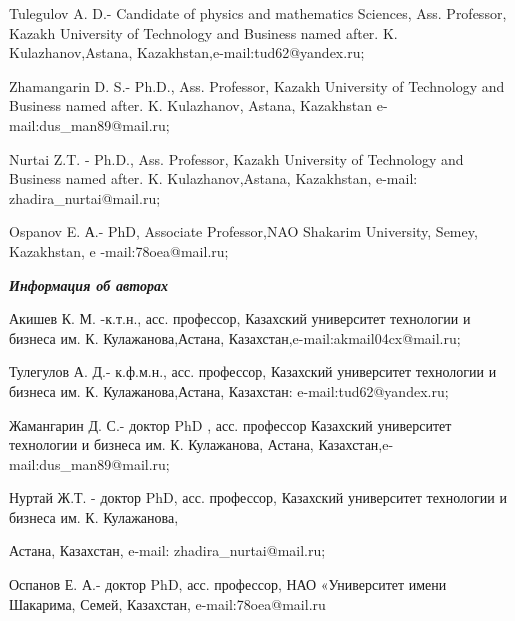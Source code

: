 Tulegulov A. D.- Candidate of physics and mathematics Sciences, Ass.
Professor, Kazakh University of Technology and Business named after. K.
Kulazhanov,Astana, Kazakhstan,e-mail:tud62@yandex.ru;

Zhamangarin D. S.- Ph.D., Ass. Professor, Kazakh University of
Technology and Business named after. K. Kulazhanov, Astana, Kazakhstan
e-mail:dus\_man89@mail.ru;

Nurtai Z.T. - Ph.D., Ass. Professor, Kazakh University of Technology and
Business named after. K. Kulazhanov,Astana, Kazakhstan, e-mail:
zhadira\_nurtai@mail.ru;

Ospanov E. А.- PhD, Associate Professor,NAO Shakarim University, Semey,
Kazakhstan, e -mail:78oea@mail.ru;

\emph{{\bfseries Информация об авторах}}

Акишев К. М. -к.т.н., асс. профессор, Казахский университет технологии и
бизнеса им. К. Кулажанова,Астана, Казахстан,e-mail:akmail04cx@mail.ru;

Тулегулов А. Д.- к.ф.м.н., асс. профессор, Казахский университет
технологии и бизнеса им. К. Кулажанова,Астана, Казахстан:
e-mail:tud62@yandex.ru;

Жамангарин Д. С.- доктор PhD , асс. профессор Казахский университет
технологии и бизнеса им. К. Кулажанова, Астана,
Казахстан,e-mail:dus\_man89@mail.ru;

Нуртай Ж.Т. - доктор PhD, асс. профессор, Казахский университет
технологии и бизнеса им. К. Кулажанова,

Астана, Казахстан, e-mail: zhadira\_nurtai@mail.ru;

Оспанов Е. А.- доктор PhD, асс. профессор, НАО «Университет имени
Шакарима, Семей, Казахстан, e-mail:78oea@mail.ru